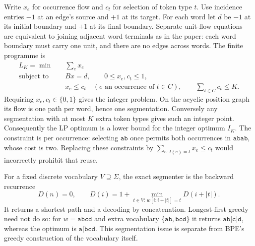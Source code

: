 \documentclass[11pt,oneside,openany]{book}
\theoremstyle{definition}\newtheorem{definition}[theorem]{Definition}
\theoremstyle{remark}\newtheorem{remark}[theorem]{Remark}
\begin{document}
Write $x_e$ for occurrence flow and $c_t$ for selection of token type $t$.
Use incidence entries $-1$ at an edge's source and $+1$ at its target.
For each word let $d$ be $-1$ at its initial boundary and $+1$ at its final
boundary. Separate unit-flow equations are equivalent to joining adjacent
word terminals as in the paper: each word boundary must carry one unit,
and there are no edges across words. The finite programme is
\begin{equation}\label{convextok:lp}
 \begin{aligned}
 L_K=\min\quad &\sum_e x_e\\
 \text{subject to}\quad &Bx=d,\qquad 0\le x_e,c_t\le1,\\
 &x_e\le c_t\quad(e\text{ an occurrence of }t\in C),\qquad
 \sum_{t\in C}c_t\le K.
 \end{aligned}
\end{equation}
Requiring $x_e,c_t\in\{0,1\}$ gives the integer problem. On the acyclic
position graph its flow is one path per word, hence one segmentation.
Conversely any segmentation with at most $K$ extra token types gives such
an integer point. Consequently the LP optimum is a lower bound for the
integer optimum $I_K$. The constraint is per occurrence: selecting
$\mathtt{ab}$ once permits both occurrences in $\mathtt{abab}$, whose
cost is two. Replacing these constraints by
$\sum_{e:\,t(e)=t}x_e\le c_t$ would incorrectly prohibit that reuse.

For a fixed discrete vocabulary $V\supseteq\Sigma$, the exact segmenter is
the backward recurrence
\[
 D(n)=0,\qquad
 D(i)=1+\min_{t\in V:\,w[i:i+|t|]=t}D(i+|t|).
\]
It returns a shortest path and a decoding by concatenation. Longest-first
greedy need not do so: for $w=\mathtt{abcd}$ and extra vocabulary
$\{\mathtt{ab},\mathtt{bcd}\}$ it returns
$\mathtt{ab}|\mathtt c|\mathtt d$, whereas the optimum is
$\mathtt a|\mathtt{bcd}$. This segmentation issue is separate from BPE's
greedy construction of the vocabulary itself.
\end{document}
